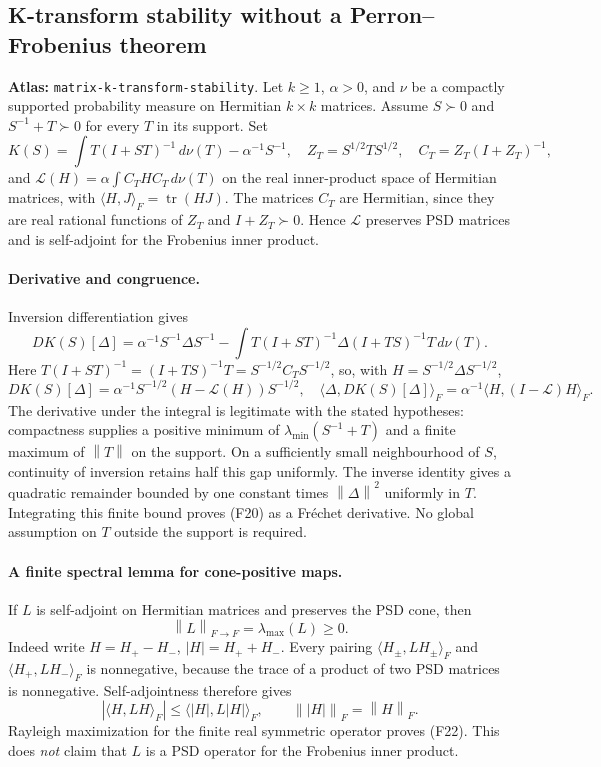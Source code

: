 \documentclass[11pt,a4paper]{article}
\newcommand{\norm}[1]{\left\lVert#1\right\rVert}
\DeclareMathOperator{\tr}{tr}
\DeclareRobustCommand{\code}[1]{{\footnotesize\urlstyle{tt}\nolinkurl{#1}}}
\begin{document}
\subsection{K-transform stability without a Perron--Frobenius theorem}
\label{sec:matrix-k-transform-stability}
\textbf{Atlas:} \code{matrix-k-transform-stability}.
Let $k\ge1$, $\alpha>0$, and $\nu$ be a compactly supported probability
measure on Hermitian $k\times k$ matrices. Assume $S\succ0$ and
$S^{-1}+T\succ0$ for every $T$ in its support. Set
\[
 K(S)=\int T(I+ST)^{-1}\,d\nu(T)-\alpha^{-1}S^{-1},\quad
 Z_T=S^{1/2}TS^{1/2},\quad C_T=Z_T(I+Z_T)^{-1},
\]
and $\mathcal L(H)=\alpha\int C_THC_T\,d\nu(T)$ on the real inner-product
space of Hermitian matrices, with $\langle H,J\rangle_F=\tr(HJ)$.
The matrices $C_T$ are Hermitian, since they are real rational functions of
$Z_T$ and $I+Z_T\succ0$. Hence $\mathcal L$ preserves PSD matrices and is
self-adjoint for the Frobenius inner product.

\paragraph{Derivative and congruence.}
Inversion differentiation gives
\[
 DK(S)[\Delta]=\alpha^{-1}S^{-1}\Delta S^{-1}
 -\int T(I+ST)^{-1}\Delta(I+TS)^{-1}T\,d\nu(T).               \tag{F20}
\]
Here $T(I+ST)^{-1}=(I+TS)^{-1}T
=S^{-1/2}C_TS^{-1/2}$, so, with $H=S^{-1/2}\Delta S^{-1/2}$,
\[
 DK(S)[\Delta]=\alpha^{-1}S^{-1/2}(H-\mathcal L(H))S^{-1/2},
 \quad
 \langle\Delta,DK(S)[\Delta]\rangle_F
 =\alpha^{-1}\langle H,(I-\mathcal L)H\rangle_F.              \tag{F21}
\]
The derivative under the integral is legitimate with the stated hypotheses:
compactness supplies a positive minimum of
$\lambda_{\min}(S^{-1}+T)$ and a finite maximum of $\norm T$ on the
support. On a sufficiently small neighbourhood of $S$, continuity of
inversion retains half this gap uniformly. The inverse identity gives a
quadratic remainder bounded by one constant times $\norm\Delta^2$
uniformly in $T$. Integrating this finite bound proves (F20) as a
Fr\'echet derivative. No global assumption on $T$ outside the support is
required.

\paragraph{A finite spectral lemma for cone-positive maps.}
If $L$ is self-adjoint on Hermitian matrices and preserves the PSD cone,
then
\[
                     \norm L_{F\to F}=\lambda_{\max}(L)\ge0. \tag{F22}
\]
Indeed write $H=H_+-H_-$, $|H|=H_++H_-$. Every pairing
$\langle H_\pm,LH_\pm\rangle_F$ and
$\langle H_+,LH_-\rangle_F$ is nonnegative, because the trace of a
product of two PSD matrices is nonnegative. Self-adjointness therefore gives
\[
 |\langle H,LH\rangle_F|\le\langle|H|,L|H|\rangle_F,
 \qquad\norm{|H|}_F=\norm H_F.
\]
Rayleigh maximization for the finite real symmetric operator proves (F22).
This does \emph{not} claim that $L$ is a PSD operator for the Frobenius
inner product.
\end{document}
